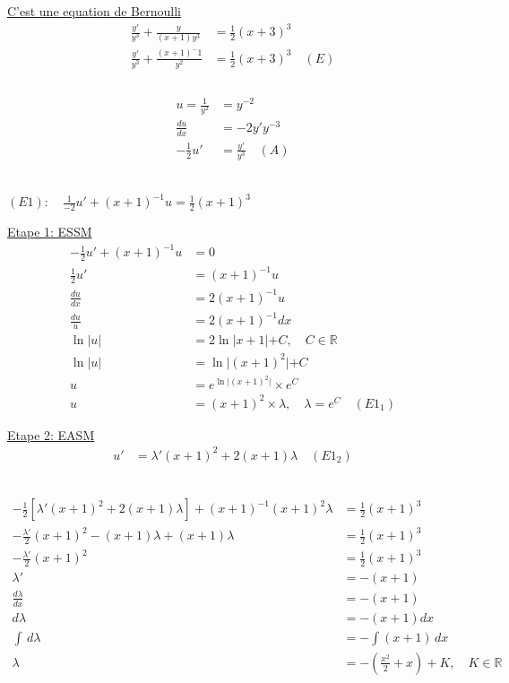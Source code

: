 \underline{C'est une equation de Bernoulli}
\begin{align*}
	\frac {y'}{y^3} + \frac{y}{(x+1)y^3} &= \frac{1}{2}(x+3)^3 \\
	\frac {y'}{y^3} + \frac{(x+1)^-1}{y^2} &= \frac{1}{2}(x+3)^3 \quad (E)\\ 
\end{align*}
 \\
\begin{align*}
	u = \frac{1}{y^2} &= y^{-2} \\
	\frac{du}{dx} &= -2y'y^{-3} \\
	-\frac{1}{2}u' &= \frac{y'}{y^3} \quad (A)
\end{align*}

 \\ 
$(E1): \quad \frac{1}{-2}u' + (x+1)^{-1}u = \frac{1}{2}(x+1)^3$

\underline{Etape 1: ESSM}
\begin{align}
	-\frac{1}{2}u' + (x+1)^{-1}u &= 0 \\
	\frac{1}{2}u' &= (x+1)^{-1}u \\
	\frac{du}{dx} &= 2(x+1)^{-1}u \\
	\frac{du}{u} &= 2(x+1)^{-1}dx \\
	\ln \lvert u \lvert &= 2 \ln \lvert x+1 \lvert + C, \quad C \in \mathbb{R} \\	
	\ln \lvert u \lvert &= \ln \lvert (x+1)^2 \lvert + C \\
	u &= e^{\ln \lvert (x+1)^2 \lvert} \times e^{C} \\
	u &= (x+1)^2 \times \lambda, \quad \lambda = e^{C} \quad (E1_1)
\end{align}

\underline{Etape 2: EASM}
\begin{align*}
	u' &= \lambda'(x+1)^2 + 2(x+1) \lambda \quad (E1_2)
\end{align*}

 \\
\begin{align*}
	-\frac{1}{2}[\lambda'(x+1)^2 + 2(x+1)\lambda] + (x+1)^{-1}(x+1)^2\lambda &= \frac{1}{2}(x+1)^3 \\
	-\frac{\lambda'}{2} (x+1)^2 - (x+1)\lambda + (x+1)\lambda &= \frac{1}{2}(x+1)^3 \\
	- \frac{\lambda'}{2} (x+1)^2 &= \frac{1}{2}(x+1)^3 \\
	\lambda' &= - (x+1) \\
	\frac{d\lambda}{dx}	 &= -(x+1) \\
	d\lambda &= -(x+1) dx \\
	\int \, d\lambda &= - \int (x+1) \, dx \\
	\lambda &= - (\frac{x^2}{2} + x) + K, \quad K \in \mathbb{R} \\	
\end{align*}

